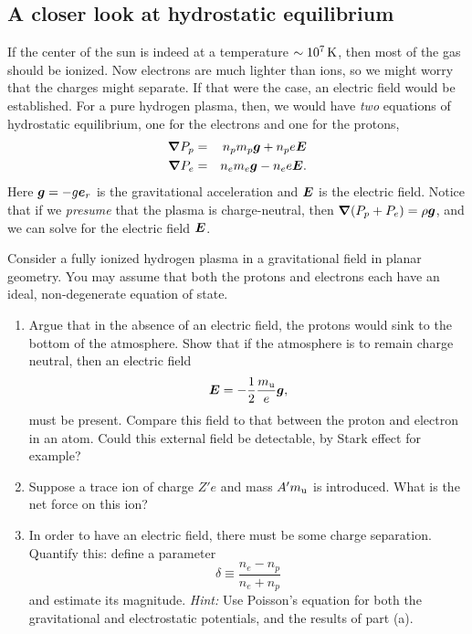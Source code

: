 \subsection{A closer look at hydrostatic equilibrium}
If the center of the sun is indeed at a temperature $\sim 10^{7}\,\mathrm{K}$, then most of the gas should be ionized. Now electrons are much lighter than ions, so we might worry that the charges might separate.  If that were the case, an electric field would be established.   For a pure hydrogen plasma, then, we would have \emph{two} equations of hydrostatic equilibrium, one for the electrons and one for the protons,
\begin{eqnarray}
\bm{\nabla} P_{p} &=& n_{p}m_{p} \bm{g}  +  n_{p}e\bm{E} \\
\bm{\nabla} P_{e} &=& n_{e}m_{e}\bm{g} - n_{e} e \bm{E}.
\end{eqnarray}
Here $\bm{g} = -g \bm{e}_{r}$ is the gravitational acceleration and $\bm{E}$ is the electric field. Notice that if we \emph{presume} that the plasma is charge-neutral, then $\bm{\nabla} (P_{p}+P_{e}) = \rho \bm{g}$, and we can solve for the electric field $\bm{E}$. 

\begin{exercisebox}
Consider a fully ionized hydrogen plasma in a gravitational field in planar geometry.  You may assume that both the protons and electrons each have an ideal, non-degenerate equation of state.
\begin{enumerate}
\item Argue that in the absence of an electric field, the protons would sink to the bottom of the atmosphere. Show that if the atmosphere is to remain charge neutral, then an electric field
\[
	\bm{E} = -\frac{1}{2}\frac{m_\mathrm{u}}{e}\bm{g},
\]
must be present. Compare this field to that between the proton and electron in an atom.  Could this external field be detectable, by Stark effect for example?

\item Suppose a trace ion of charge $Z'e$ and mass $A'm_\mathrm{u}$ is	 introduced.  What is the net force on this ion?

\item In order to have an electric field, there must be some charge separation.  Quantify this: define a parameter
\[ \delta \equiv \frac{n_{e}-n_{p}}{n_{e} + n_{p}} \]
and estimate its magnitude.  \emph{Hint:} Use Poisson's equation for both the gravitational and electrostatic potentials, and the results of part (a).
\end{enumerate}
\end{exercisebox}

